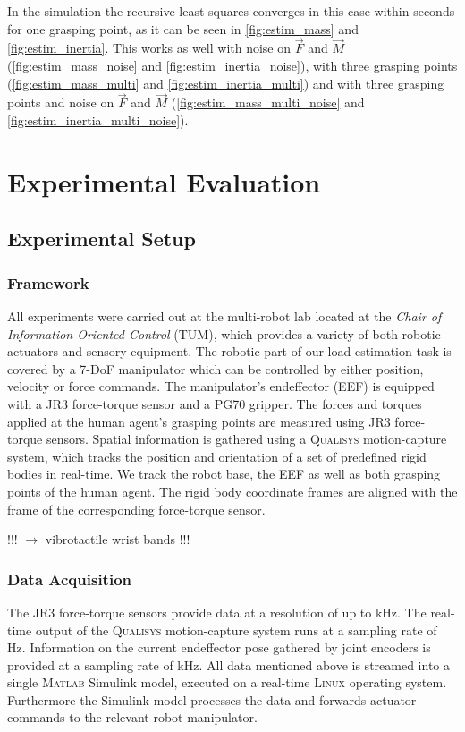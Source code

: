 In the simulation the recursive least squares converges in this case within seconds for one grasping point, as it can be seen in \ref{fig:estim_mass} and \ref{fig:estim_inertia}. This works as well with noise on $\vec F$ and $\vec M$ (\ref{fig:estim_mass_noise} and \ref{fig:estim_inertia_noise}), with three grasping points (\ref{fig:estim_mass_multi} and \ref{fig:estim_inertia_multi}) and with three grasping points and noise on $\vec F$ and $\vec M$ (\ref{fig:estim_mass_multi_noise} and \ref{fig:estim_inertia_multi_noise}).

\chapter{Experimental Evaluation}
\label{chap:experimental_evaluation}

\section{Experimental Setup}
\subsection{Framework}
All experiments were carried out at the multi-robot lab located at the \textit{Chair of Information-Oriented Control} (TUM), which provides a variety of both robotic actuators and sensory equipment. The robotic part of our load estimation task is covered by a 7-DoF manipulator which can be controlled by either position, velocity or force commands. The manipulator's endeffector (EEF) is equipped with a \textsc{JR3} force-torque sensor and a \textsc{PG70} gripper. The forces and torques applied at the human agent's grasping points are measured using \textsc{JR3} force-torque sensors. Spatial information is gathered using a \textsc{Qualisys} motion-capture system, which tracks the position and orientation of a set of predefined rigid bodies in real-time. We track the robot base, the EEF as well as both grasping points of the human agent. The rigid body coordinate frames are aligned with the frame of the corresponding force-torque sensor.

!!! $\longrightarrow$ vibrotactile wrist bands !!!
\subsection{Data Acquisition}
The \textsc{JR3} force-torque sensors provide data at a resolution of up to \unit[8]{kHz}. The real-time output of the \textsc{Qualisys} motion-capture system runs at a sampling rate of \unit[150]{Hz}. Information on the current endeffector pose gathered by joint encoders is provided at a sampling rate of \unit[1]{kHz}. All data mentioned above is streamed into a single \textsc{Matlab} Simulink model, executed on a real-time \textsc{Linux} operating system. Furthermore the Simulink model processes the data and forwards actuator commands to the relevant robot manipulator.

